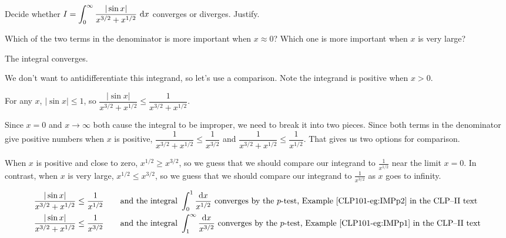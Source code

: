 \begin{question}[M121 1999A]
Decide whether
$I=\displaystyle\int_0^\infty\frac{|\sin x|}{x^{3/2}+x^{1/2}}\ \mathrm{d}x $
converges or diverges. Justify.
\end{question}

\begin{hint}
Which of the two terms in the denominator is more important when $x\approx
0$? Which one is more important when $x$ is very large?
\end{hint}

\begin{answer}
The integral converges.
\end{answer}

\begin{solution}
We don't want to antidifferentiate this integrand, so let's use a comparison. Note the integrand is positive when $x>0$.

For any $x$, $|\sin x| \leq 1$, so $\dfrac{|\sin x|}{x^{3/2}+x^{1/2}} \leq \dfrac{1}{x^{3/2}+x^{1/2}} $.


Since $x=0$ and $x \to \infty$ both cause the integral to be improper, we need to break it into two pieces.
Since both terms in the denominator give positive numbers when $x$ is positive, $\dfrac{1}{x^{3/2}+x^{1/2}} \leq \dfrac{1}{x^{3/2}}$ and $\dfrac{1}{x^{3/2}+x^{1/2}} \leq \dfrac{1}{x^{1/2}}$. That gives us two options for comparison.

When $x$ is positive and close to zero, $x^{1/2}  \ge x^{3/2}$, so we guess that we should compare our integrand to $\frac{1}{x^{1/2}}$ near the limit $x=0$. In contrast, when $x$ is very large, $x^{1/2}  \le x^{3/2}$, so we guess that we should compare our integrand to $\frac{1}{x^{3/2}}$ as $x$ goes to infinity.

\begin{alignat*}{3}
\frac{|\sin x|}{x^{3/2}+x^{1/2}}
&\le \frac{1}{x^{1/2}}
\quad&&\text{and the integral }\int_0^1\frac{\dee{x}}{x^{1/2}}\text{ converges
by the $p$-test,  Example \eref{CLP101}{eg:IMPp2} in the CLP--II text} \\
\frac{|\sin x|}{x^{3/2}+x^{1/2}}
&\le \frac{1}{x^{3/2}}
\quad&&\text{and the integral }\int_1^\infty\frac{\dee{x}}{x^{3/2}}\text{ converges
by the $p$-test, Example \eref{CLP101}{eg:IMPp1} in the CLP--II text}
\end{alignat*}


\end{solution}
